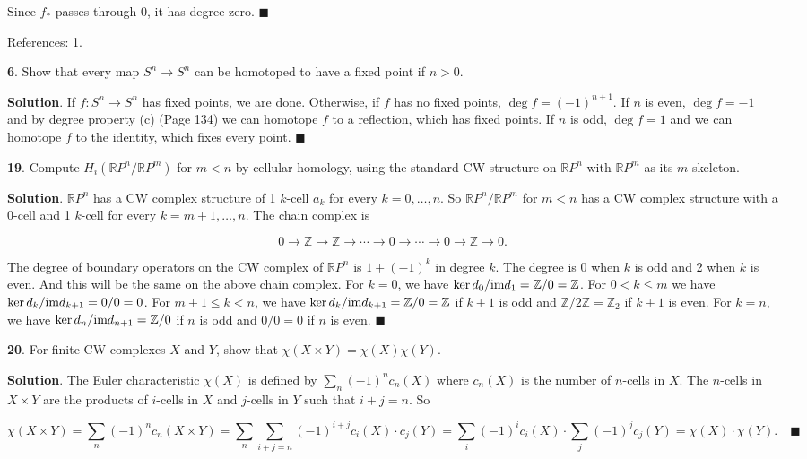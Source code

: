 \documentclass{article}
\newcommand{\R}{\mathbb{R}}
\newcommand{\Z}{\mathbb{Z}}
\newcommand{\im}{\textnormal{im}}
\begin{document}
Since $f_{\ast}$ passes through 0, it has degree zero. $\blacksquare$
\medskip

References: \href{https://pages.uoregon.edu/njp/635hw4solutions.pdf}{1}.
\bigskip
\bigskip

\textbf{6}. Show that every map $S^{n}\to S^{n}$ can be homotoped to have a fixed point if $n > 0$.
\medskip

\textbf{Solution}. If $f:S^{n}\to S^{n}$ has fixed points, we are done. Otherwise, if $f$ has no fixed points, $\deg f = (-1)^{n+1}$. If $n$ is even, $\deg f = -1$ and by degree property (c) (Page 134) we can homotope $f$ to a reflection, which has fixed points. If $n$ is odd, $\deg f = 1$ and we can homotope $f$ to the identity, which fixes every point. $\blacksquare$
\bigskip
\bigskip

\textbf{19}. Compute $H_{i}(\R P^{n}/\R P^{m})$ for $m < n$ by cellular homology, using the standard CW structure on $\R P^{n}$ with $\R P^{m}$ as its $m$-skeleton.
\medskip

\textbf{Solution}. $\R P^{n}$ has a CW complex structure of 1 $k$-cell $a_{k}$ for every $k = 0,\ldots, n$. So $\R P^{n}/\R P^{m}$ for $m < n$ has a CW complex structure with a 0-cell and 1 $k$-cell for every $k = m+1,\ldots, n$. The chain complex is

$$0\to \Z\to \Z\to \cdots \to 0\to \cdots\to 0\to \Z\to 0.$$

The degree of boundary operators on the CW complex of $\R P^{n}$ is $1 + (-1)^{k}$ in degree $k$. The degree is 0 when $k$ is odd and 2 when $k$ is even. And this will be the same on the above chain complex. For $k = 0$, we have $\ker d_{0}/\im d_{1} = \Z/0 = \Z$. For $0 < k\leq m$ we have $\ker d_{k}/\im d_{k+1} = 0/0 = 0$. For $m+1\leq k < n$, we have $\ker d_{k}/\im d_{k+1} = \Z/0 = \Z$ if $k+1$ is odd and $\Z/2\Z = \Z_{2}$ if $k+1$ is even. For $k = n$, we have $\ker d_{n}/\im d_{n+1} = \Z/0$ if $n$ is odd and $0/0 = 0$ if $n$ is even. $\blacksquare$
\bigskip
\bigskip

\textbf{20}. For finite CW complexes $X$ and $Y$, show that $\chi(X\times Y) = \chi(X)\chi(Y)$.
\medskip

\textbf{Solution}. The Euler characteristic $\chi(X)$ is defined by $\sum_{n}(-1)^{n}c_{n}(X)$ where $c_{n}(X)$ is the number of $n$-cells in $X$. The $n$-cells in $X\times Y$ are the products of $i$-cells in $X$ and $j$-cells in $Y$ such that $i+j = n$. So

$$\chi(X\times Y) = \sum_{n} (-1)^{n}c_{n}(X\times Y) = \sum_{n} \sum_{i+j=n} (-1)^{i+j}c_{i}(X)\cdot c_{j}(Y) = \sum_{i}(-1)^{i}c_{i}(X)\cdot \sum_{j}(-1)^{j}c_{j}(Y) = \chi(X)\cdot \chi(Y).\quad \blacksquare$$
\bigskip
\end{document}
